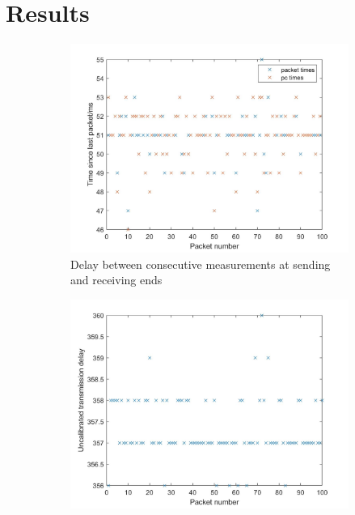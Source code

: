 \documentclass[twoside,twocolumn,12pt]{article}
\begin{document}
 

\clearpage

\clearpage
\section{Results}
\begin{figure}[hb!]
  \centering
  \begin{subfigure}[t]{0.325\textwidth}
    \includegraphics[width=\linewidth]{timestep}
   \caption{Delay between consecutive measurements at sending and receiving ends}
  \label{fig:ts}
  \end{subfigure}
  \begin{subfigure}[t]{0.325\textwidth}
    \includegraphics[width=\linewidth]{delay}

\end{subfigure}
\end{figure}
\end{document}
